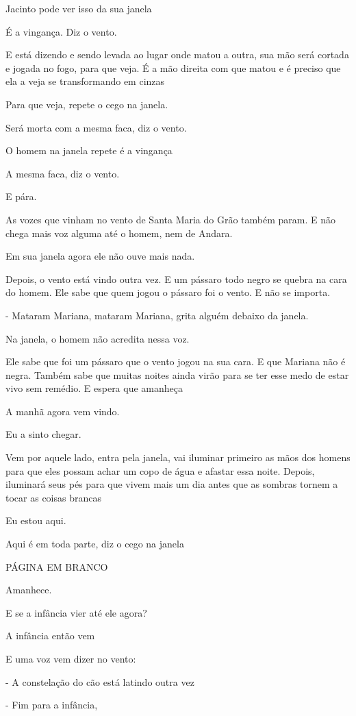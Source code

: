 Jacinto pode ver isso da sua janela

É a vingança. Diz o vento.

E está dizendo e sendo levada ao lugar onde matou a outra, sua mão será
cortada e jogada no fogo, para que veja. É a mão direita com que matou e
é preciso que ela a veja se transformando em cinzas

Para que veja, repete o cego na janela.

Será morta com a mesma faca, diz o vento.

O homem na janela repete é a vingança

A mesma faca, diz o vento.

E pára.

As vozes que vinham no vento de Santa Maria do Grão também param. E não
chega mais voz alguma até o homem, nem de Andara.

Em sua janela agora ele não ouve mais nada.

Depois, o vento está vindo outra vez. E um pássaro todo negro se quebra
na cara do homem. Ele sabe que quem jogou o pássaro foi o vento. E não
se importa.

- Mataram Mariana, mataram Mariana, grita alguém debaixo da janela.

Na janela, o homem não acredita nessa voz.

Ele sabe que foi um pássaro que o vento jogou na sua cara. E que Mariana
não é negra. Também sabe que muitas noites ainda virão para se ter esse
medo de estar vivo sem remédio. E espera que amanheça

A manhã agora vem vindo.

Eu a sinto chegar.

Vem por aquele lado, entra pela janela, vai iluminar primeiro as mãos
dos homens para que eles possam achar um copo de água e afastar essa
noite. Depois, iluminará seus pés para que vivem mais um dia antes que
as sombras tornem a tocar as coisas brancas

Eu estou aqui.

Aqui é em toda parte, diz o cego na janela

PÁGINA EM BRANCO

Amanhece.

E se a infância vier até ele agora?

A infância então vem

E uma voz vem dizer no vento:

- A constelação do cão está latindo outra vez

- Fim para a infância,


